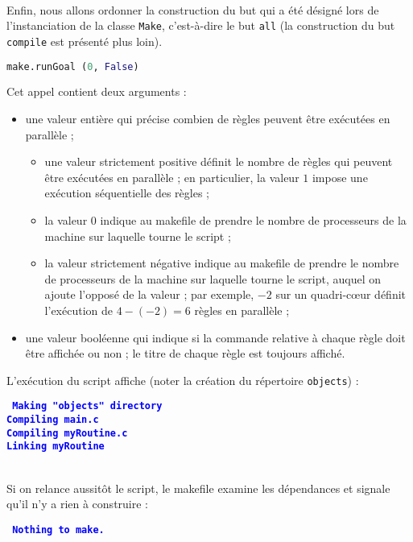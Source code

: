 \documentclass[a4paper,11pt]{extarticle}
\begin{document}
~\\Enfin, nous allons ordonner la construction du but qui a été désigné lors de l'instanciation de la classe \texttt{Make}, c'est-à-dire le but \texttt{all} (la construction du but \texttt{compile} est présenté plus loin).
\begin{lstlisting}[language=py]
make.runGoal (0, False)
\end{lstlisting}
Cet appel contient deux arguments :
\begin{itemize}
\item une valeur entière qui précise combien de règles peuvent être exécutées en parallèle ;
  \begin{itemize}
  \item une valeur strictement positive définit le nombre de règles qui peuvent être exécutées en parallèle ; en particulier, la valeur $1$ impose une exécution séquentielle des règles ;
  \item la valeur $0$ indique au makefile de prendre le nombre de processeurs de la machine sur laquelle tourne le script ;
  \item la valeur strictement négative indique au makefile de prendre le nombre de processeurs de la machine sur laquelle tourne le script, auquel on ajoute l'opposé de la valeur ; par exemple, $-2$ sur un quadri-cœur définit l'exécution de $4-(-2)=6$ règles en parallèle ;
  \end{itemize}
\item une valeur booléenne qui indique si la commande relative à chaque règle doit être affichée ou non ; le titre de chaque règle est toujours affiché.
\end{itemize}

L'exécution du script affiche (noter la création du répertoire \texttt{objects}) :

\begin{mdframed}[hidealllines=true,backgroundcolor=lightgray!20]
\tt\footnotesize
\textcolor{blue}{\bf Making "objects" directory}\\
\textcolor{blue}{\bf Compiling main.c}\\
\textcolor{blue}{\bf Compiling myRoutine.c}\\
\textcolor{blue}{\bf Linking myRoutine}
\end{mdframed}

~\\Si on relance aussitôt le script, le makefile examine les dépendances et signale qu'il n'y a rien à construire :

\begin{mdframed}[hidealllines=true,backgroundcolor=lightgray!20]
\tt\footnotesize
\textcolor{blue}{\bf Nothing to make.}
\end{mdframed}
\end{document}
